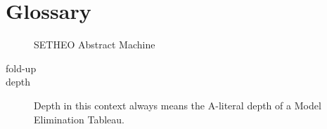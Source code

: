 \chapter{Glossary}

\begin{description}
\item[\SAM]
	SETHEO Abstract Machine
\item[fold-up]
\item[depth] 
Depth in this context always means the A-literal depth of a
Model Elimination Tableau.
\end{description}
